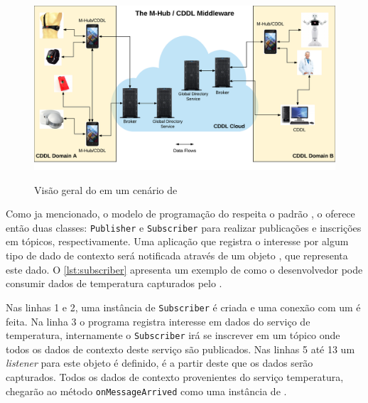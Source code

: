 \begin{figure}[htb]
	\centering
	\caption{Visão geral do \mhubcddl em um cenário de \iomt}
	\includegraphics[width=.85\linewidth]{img/general-vision-cddl.png}
	\label{fig:general-vision-cddl}
\end{figure}


Como ja mencionado, o modelo de programação do \cddl respeita o padrão \pubsub, o \middleware oferece então duas classes: \texttt{Publisher} e \texttt{Subscriber} para realizar publicações e inscrições em tópicos, respectivamente.
Uma aplicação que registra o interesse por algum tipo de dado de contexto será notificada através de um objeto \msg, que representa este dado.
O \autoref{lst:subscriber} apresenta um exemplo de como o desenvolvedor pode consumir dados de temperatura capturados pelo \middleware.



Nas linhas 1 e 2, uma instância de \texttt{Subscriber} é criada e uma conexão com um \broker é feita.
Na linha 3 o programa registra interesse em dados do serviço de temperatura, internamente o \texttt{Subscriber} irá se inscrever em um tópico onde todos os dados de contexto deste serviço são publicados.
Nas linhas 5 até 13 um \textit{listener} para este objeto é definido, é a partir deste que os dados serão capturados.
Todos os dados de contexto provenientes do serviço temperatura, chegarão ao método \texttt{onMessageArrived} como uma instância de \msg.

